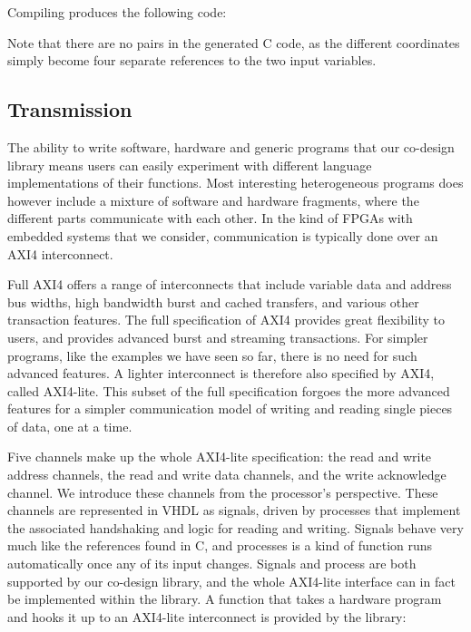 Compiling  produces the following code:

\begin{code}
\end{code}

\noindent Note that there are no pairs in the generated C code, as the different coordinates simply become four separate references to the two input variables.

\subsection{Transmission}

The ability to write software, hardware and generic programs that our co-design library means users can easily experiment with different language implementations of their functions. Most interesting heterogeneous programs does however include a mixture of software and hardware fragments, where the different parts communicate with each other. In the kind of FPGAs with embedded systems that we consider, communication is typically done over an AXI4 interconnect.

Full AXI4 offers a range of interconnects that include variable data and address bus widths, high bandwidth burst and cached transfers, and various other transaction features. The full specification of AXI4 provides great flexibility to users, and provides advanced burst and streaming transactions. For simpler programs, like the examples we have seen so far, there is no need for such advanced features. A lighter interconnect is therefore also specified by AXI4, called AXI4-lite. This subset of the full specification forgoes the more advanced features for a simpler communication model of writing and reading single pieces of data, one at a time.

Five channels make up the whole AXI4-lite specification: the read and write address channels, the read and write data channels, and the write acknowledge channel. We introduce these channels from the processor's perspective. These channels are represented in VHDL as signals, driven by processes that implement the associated handshaking and logic for reading and writing. Signals behave very much like the references found in C, and processes is a kind of function runs automatically once any of its input changes. Signals and process are both supported by our co-design library, and the whole AXI4-lite interface can in fact be implemented within the library. A function that takes a hardware program and hooks it up to an AXI4-lite interconnect is provided by the library:

